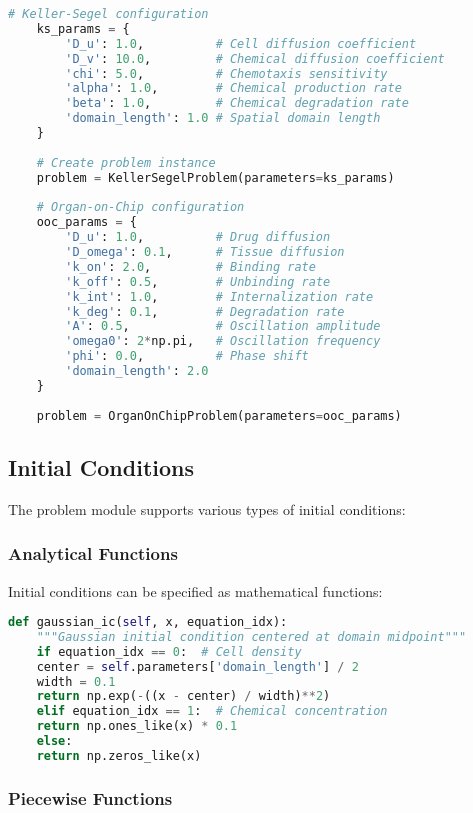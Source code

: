 \begin{lstlisting}[language=Python, caption=Problem Configuration Example]
	# Keller-Segel configuration
	ks_params = {
		'D_u': 1.0,          # Cell diffusion coefficient
		'D_v': 10.0,         # Chemical diffusion coefficient  
		'chi': 5.0,          # Chemotaxis sensitivity
		'alpha': 1.0,        # Chemical production rate
		'beta': 1.0,         # Chemical degradation rate
		'domain_length': 1.0 # Spatial domain length
	}
	
	# Create problem instance
	problem = KellerSegelProblem(parameters=ks_params)
	
	# Organ-on-Chip configuration  
	ooc_params = {
		'D_u': 1.0,          # Drug diffusion
		'D_omega': 0.1,      # Tissue diffusion
		'k_on': 2.0,         # Binding rate
		'k_off': 0.5,        # Unbinding rate
		'k_int': 1.0,        # Internalization rate
		'k_deg': 0.1,        # Degradation rate
		'A': 0.5,            # Oscillation amplitude
		'omega0': 2*np.pi,   # Oscillation frequency
		'phi': 0.0,          # Phase shift
		'domain_length': 2.0
	}
	
	problem = OrganOnChipProblem(parameters=ooc_params)
\end{lstlisting}

\subsection{Initial Conditions}
\label{subsec:initial_conditions}

The problem module supports various types of initial conditions:

\subsubsection{Analytical Functions}

Initial conditions can be specified as mathematical functions:

\begin{lstlisting}[language=Python, caption=Analytical Initial Conditions]
	def gaussian_ic(self, x, equation_idx):
	"""Gaussian initial condition centered at domain midpoint"""
	if equation_idx == 0:  # Cell density
	center = self.parameters['domain_length'] / 2
	width = 0.1
	return np.exp(-((x - center) / width)**2)
	elif equation_idx == 1:  # Chemical concentration
	return np.ones_like(x) * 0.1
	else:
	return np.zeros_like(x)
\end{lstlisting}

\subsubsection{Piecewise Functions}

